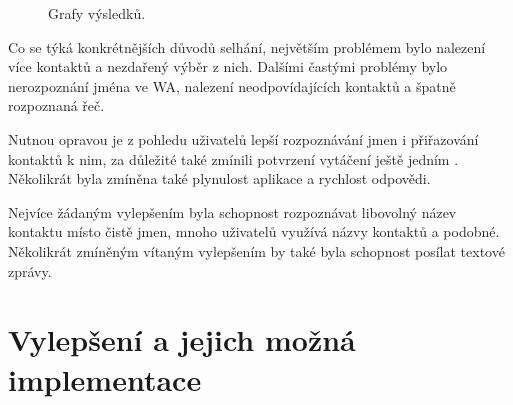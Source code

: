 \newsavebox{\tempbox}
\begin{figure}[H]
    \qquad
    \caption{Grafy výsledků.}
\end{figure}

Co se týká konkrétnějších důvodů selhání, největším problémem bylo nalezení více
kontaktů a nezdařený výběr z nich. Dalšími častými problémy bylo nerozpoznání
jména ve WA, nalezení neodpovídajících kontaktů a špatně rozpoznaná řeč.

Nutnou opravou je z pohledu uživatelů lepší rozpoznávání jmen i přiřazování
kontaktů k nim, za důležité také zmínili potvrzení vytáčení ještě jedním
. Několikrát byla zmíněna také plynulost aplikace a rychlost
odpovědi.

Nejvíce žádaným vylepšením byla schopnost rozpoznávat libovolný název kontaktu
místo čistě jmen, mnoho uživatelů využívá názvy kontaktů  a podobné.
Několikrát zmíněným vítaným vylepšením by také byla schopnost posílat textové
zprávy.

\section{Vylepšení a jejich možná implementace}\label{improvements}

